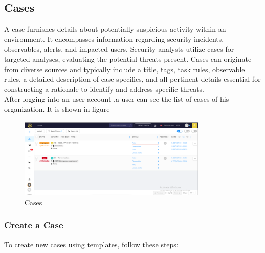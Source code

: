 \documentclass{article}
\begin{document}
  \subsection{Cases}
A case furnishes details about potentially suspicious activity within an environment. It encompasses information regarding security incidents, observables, alerts, and impacted users. Security analysts utilize cases for targeted analyses, evaluating the potential threats present. Cases can originate from diverse sources and typically include a title, tags, task rules, observable rules, a detailed description of case specifics, and all pertinent details essential for constructing a rationale to identify and address specific threats.\\
After logging into an user account ,a user can see the list of cases of his
organization. It is shown in figure\\
\begin{figure}[ht]
    \centering
    \includegraphics[width=0.8\textwidth]{img7.png}
    \caption{Cases}
    \label{fig:entities}
\end{figure}

\subsubsection*{Create a Case}

To create new cases using templates, follow these steps:
\end{document}
